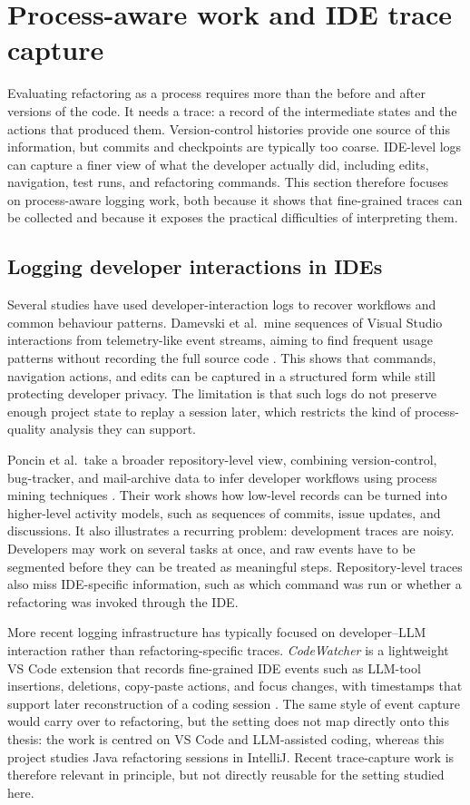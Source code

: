 \section{Process-aware work and IDE trace capture}
\label{sec:process-aware-logging}

Evaluating refactoring as a process requires more than the before and after versions of the code. It needs a trace: a record of the intermediate states and the actions that produced them. Version-control histories provide one source of this information, but commits and checkpoints are typically too coarse. IDE-level logs can capture a finer view of what the developer actually did, including edits, navigation, test runs, and refactoring commands. This section therefore focuses on process-aware logging work, both because it shows that fine-grained traces can be collected and because it exposes the practical difficulties of interpreting them.

\subsection{Logging developer interactions in IDEs}
Several studies have used developer-interaction logs to recover workflows and common behaviour patterns. Damevski et al.\ mine sequences of Visual Studio interactions from telemetry-like event streams, aiming to find frequent usage patterns without recording the full source code \cite{damevski2017usagesmells}. This shows that commands, navigation actions, and edits can be captured in a structured form while still protecting developer privacy. The limitation is that such logs do not preserve enough project state to replay a session later, which restricts the kind of process-quality analysis they can support.

Poncin et al.\ take a broader repository-level view, combining version-control, bug-tracker, and mail-archive data to infer developer workflows using process mining techniques \cite{poncin2011processmining}. Their work shows how low-level records can be turned into higher-level activity models, such as sequences of commits, issue updates, and discussions. It also illustrates a recurring problem: development traces are noisy. Developers may work on several tasks at once, and raw events have to be segmented before they can be treated as meaningful steps. Repository-level traces also miss IDE-specific information, such as which command was run or whether a refactoring was invoked through the IDE.

More recent logging infrastructure has typically focused on developer--LLM interaction rather than refactoring-specific traces. \emph{CodeWatcher} is a lightweight VS Code extension that records fine-grained IDE events such as LLM-tool insertions, deletions, copy-paste actions, and focus changes, with timestamps that support later reconstruction of a coding session \cite{basha2025codewatcher}. The same style of event capture would carry over to refactoring, but the setting does not map directly onto this thesis: the work is centred on VS Code and LLM-assisted coding, whereas this project studies Java refactoring sessions in IntelliJ. Recent trace-capture work is therefore relevant in principle, but not directly reusable for the setting studied here.

